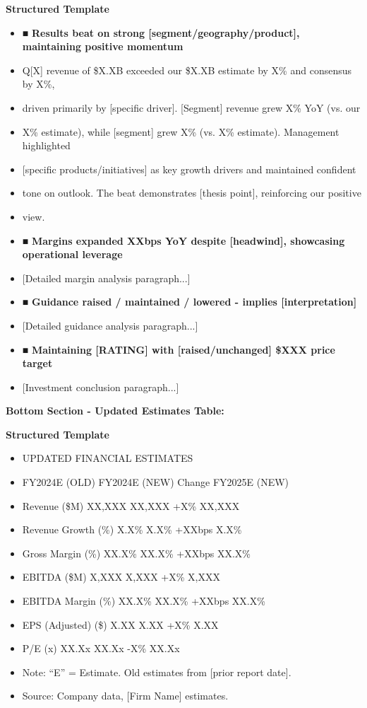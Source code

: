 \documentclass[11pt]{article}
\begin{document}
\textbf{Structured Template}
\begin{itemize}[leftmargin=*,itemsep=2pt,topsep=2pt]
\item {} ■ \textbf{Results beat on strong [segment/geography/product], maintaining positive momentum}
\item {} Q[X] revenue of \$X.XB exceeded our \$X.XB estimate by X\% and consensus by X\%,
\item {} driven primarily by [specific driver]. [Segment] revenue grew X\% YoY (vs. our
\item {} X\% estimate), while [segment] grew X\% (vs. X\% estimate). Management highlighted
\item {} [specific products/initiatives] as key growth drivers and maintained confident
\item {} tone on outlook. The beat demonstrates [thesis point], reinforcing our positive
\item {} view.
\item {} ■ \textbf{Margins expanded XXbps YoY despite [headwind], showcasing operational leverage}
\item {} [Detailed margin analysis paragraph...]
\item {} ■ \textbf{Guidance raised / maintained / lowered - implies [interpretation]}
\item {} [Detailed guidance analysis paragraph...]
\item {} ■ \textbf{Maintaining [RATING] with [raised/unchanged] \$XXX price target}
\item {} [Investment conclusion paragraph...]
\end{itemize}

\textbf{Bottom Section - Updated Estimates Table:}


\textbf{Structured Template}
\begin{itemize}[leftmargin=*,itemsep=2pt,topsep=2pt]
\item {} UPDATED FINANCIAL ESTIMATES
\item {} FY2024E (OLD) FY2024E (NEW) Change FY2025E (NEW)
\item {} Revenue (\$M) XX,XXX XX,XXX +X\% XX,XXX
\item {} Revenue Growth (\%) X.X\% X.X\% +XXbps X.X\%
\item {} Gross Margin (\%) XX.X\% XX.X\% +XXbps XX.X\%
\item {} EBITDA (\$M) X,XXX X,XXX +X\% X,XXX
\item {} EBITDA Margin (\%) XX.X\% XX.X\% +XXbps XX.X\%
\item {} EPS (Adjusted) (\$) X.XX X.XX +X\% X.XX
\item {} P/E (x) XX.Xx XX.Xx -X\% XX.Xx
\item {} Note: ``E'' = Estimate. Old estimates from [prior report date].
\item {} Source: Company data, [Firm Name] estimates.
\end{itemize}
\end{document}
